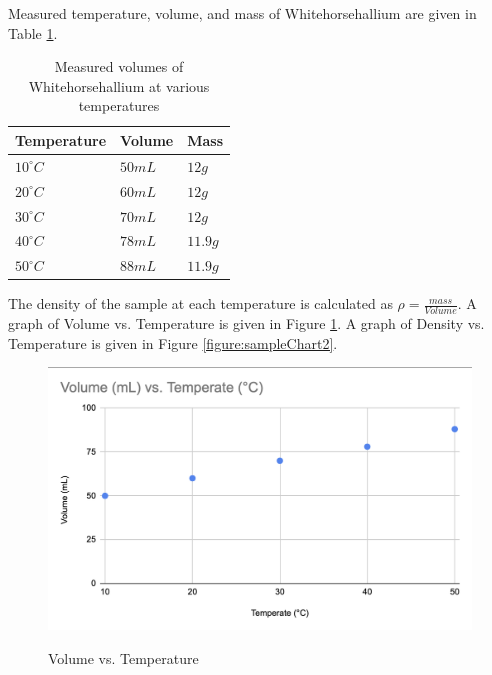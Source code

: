 \documentclass[11pt, oneside]{article}   	%
\newcommand{\chemname}{Whitehorsehallium }
\begin{document}
Measured temperature, volume, and mass of \chemname are given in Table \ref{table:sampleTable}.

\begin{table}[p]
\centering
\caption{Measured volumes of \chemname at various temperatures}
\begin{tabular}[b]{l | l| l}
\hline
Temperature & Volume & Mass \\
\hline
$10^{\circ} C$ & $50mL$   & $12 g$ \\
$20^{\circ} C$ & $60mL$   & $12 g$ \\
$30^{\circ} C$ & $70mL$   & $12 g$ \\
$40^{\circ} C$ & $78mL$   & $11.9 g$ \\
$50^{\circ} C$ & $88mL$   & $11.9 g$ \\
\end{tabular}
\label{table:sampleTable}
\end{table}

The density of the sample at each temperature is calculated as $\rho = \frac{mass}{Volume}$.
A graph of Volume vs. Temperature is given in Figure \ref{figure:sampleChart1}.
A graph of Density vs. Temperature is given in Figure \ref{figure:sampleChart2}.

\begin{figure}[p]
\centering
\caption{Volume vs. Temperature}
\includegraphics[scale=0.5]{Sample_Lab_Chart_1.png}
 \label{figure:sampleChart1}
 \end{figure}  
\end{document}
